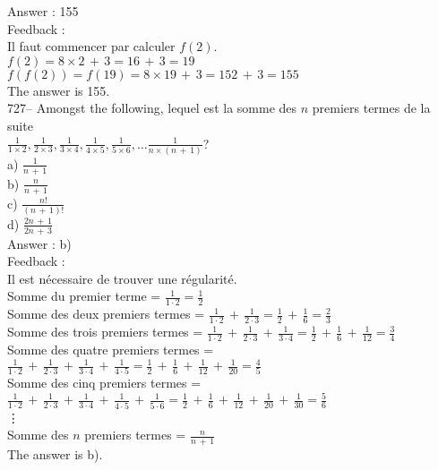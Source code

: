 ﻿\documentclass[letterpaper, 12pt]{article}
\begin{document}
Answer : 155\\

Feedback : \\
Il faut commencer par calculer $f(2)$.\\
$f(2)=8\times2\,+\,3=16\,+\,3=19$\\
$f(f(2))=f(19)=8\times19\,+\,3= 152\,+\,3=155$\\
The answer is 155.\\

727-- Amongst the following, lequel est la somme des $n$ premiers
termes de la suite \\$\frac{1}{1\times2}, \frac{1}{2\times3},
\frac{1}{3\times4}, \frac{1}{4\times5}, \frac{1}{5\times6}, \ldots
\frac{1}{n\times(n\,+\,1)}$?\\
a) $\frac{1}{n\,+\,1}$\\[2mm]
b) $\frac{n}{n\,+\,1}$\\[2mm]
c) $\frac{n!}{(n\,+\,1)!}$\\[2mm]
d) $\frac{2n\,+\,1}{2n\,+\,3}$\\

Answer : b)\\

Feedback : \\
Il est n\'ecessaire de trouver une r\'egularit\'e. \\
Somme du premier terme = $\frac{1}{1\cdot2}=\frac{1}{2}$\\[2mm]
Somme des deux premiers termes =
$\frac{1}{1\cdot2}\,+\,\frac{1}{2\cdot3}=\frac{1}{2}\,+\,\frac{1}{6}=\frac{2}{3}$\\[2mm]
Somme des trois premiers termes =
$\frac{1}{1\cdot2}\,+\,\frac{1}{2\cdot3}\,+\,\frac{1}{3\cdot4}=\frac{1}{2}\,+\,\frac{1}{6}\,+\,\frac{1}{12}=\frac{3}{4}$\\[2mm]
Somme des quatre premiers termes =
$\frac{1}{1\cdot2}\,+\,\frac{1}{2\cdot3}\,+\,\frac{1}{3\cdot4}\,+\,\frac{1}{4\cdot5}=\frac{1}{2}\,+\,\frac{1}{6}\,+\,\frac{1}{12}\,+\,\frac{1}{20}=\frac{4}{5}$\\[2mm]
Somme des cinq premiers termes =
$\frac{1}{1\cdot2}\,+\,\frac{1}{2\cdot3}\,+\,\frac{1}{3\cdot4}\,+\,\frac{1}{4\cdot5}\,+\,\frac{1}{5\cdot6}=\frac{1}{2}\,+\,\frac{1}{6}\,+\,\frac{1}{12}\,+\,\frac{1}{20}\,+\,\frac{1}{30}=\frac{5}{6}$\\
\vdots\\
Somme des $n$ premiers termes = $\frac{n}{n\,+\,1}$\\[2mm]
The answer is b).\\
\end{document}
